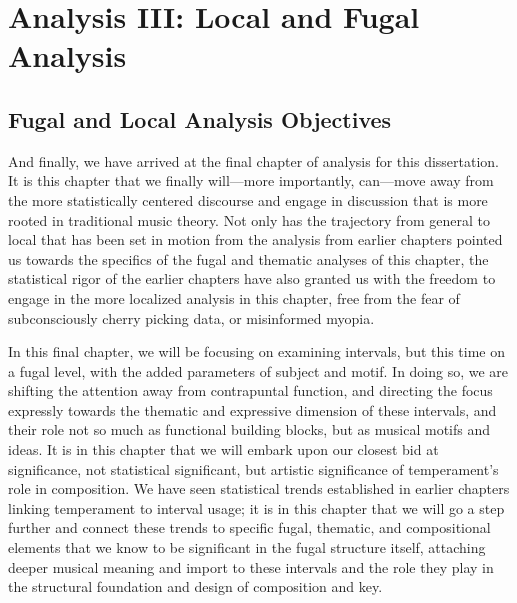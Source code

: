     
    
    
    

    \hypertarget{Analysis III: Local and Fugal Analysis}{\chapter{Analysis III: Local and Fugal Analysis}\label{Analysis III: Local and Fugal Analysis}}


    \section{Fugal and Local Analysis
Objectives}\label{fugal-and-local-analysis-objectives}

    And finally, we have arrived at the final chapter of analysis for this
dissertation. It is this chapter that we finally will---more
importantly, can---move away from the more statistically centered
discourse and engage in discussion that is more rooted in traditional
music theory. Not only has the trajectory from general to local that has
been set in motion from the analysis from earlier chapters pointed us
towards the specifics of the fugal and thematic analyses of this
chapter, the statistical rigor of the earlier chapters have also granted
us with the freedom to engage in the more localized analysis in this
chapter, free from the fear of subconsciously cherry picking data, or
misinformed myopia.

In this final chapter, we will be focusing on examining intervals, but
this time on a fugal level, with the added parameters of subject and
motif. In doing so, we are shifting the attention away from contrapuntal
function, and directing the focus expressly towards the thematic and
expressive dimension of these intervals, and their role not so much as
functional building blocks, but as musical motifs and ideas. It is in
this chapter that we will embark upon our closest bid at significance,
not statistical significant, but artistic significance of temperament's
role in composition. We have seen statistical trends established in
earlier chapters linking temperament to interval usage; it is in this
chapter that we will go a step further and connect these trends to
specific fugal, thematic, and compositional elements that we know to be
significant in the fugal structure itself, attaching deeper musical
meaning and import to these intervals and the role they play in the
structural foundation and design of composition and key.


